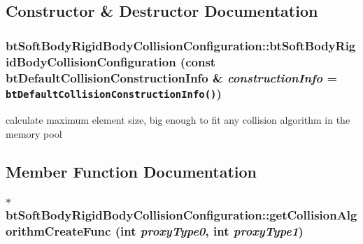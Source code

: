 \subsection{Constructor \& Destructor Documentation}
\hypertarget{classbt_soft_body_rigid_body_collision_configuration_ed032b3ffc351d036e28b503d3cdc801}{
\subsubsection[btSoftBodyRigidBodyCollisionConfiguration]{\setlength{\rightskip}{0pt plus 5cm}btSoftBodyRigidBodyCollisionConfiguration::btSoftBodyRigidBodyCollisionConfiguration (const btDefaultCollisionConstructionInfo \& {\em constructionInfo} = {\tt btDefaultCollisionConstructionInfo()})}}
\label{classbt_soft_body_rigid_body_collision_configuration_ed032b3ffc351d036e28b503d3cdc801}




calculate maximum element size, big enough to fit any collision algorithm in the memory pool 

\subsection{Member Function Documentation}
\hypertarget{classbt_soft_body_rigid_body_collision_configuration_81be88bc433469b4703fc0fb9d504a50}{
\subsubsection[getCollisionAlgorithmCreateFunc]{ $\ast$ btSoftBodyRigidBodyCollisionConfiguration::getCollisionAlgorithmCreateFunc (int {\em proxyType0}, \/  int {\em proxyType1})}}
\label{classbt_soft_body_rigid_body_collision_configuration_81be88bc433469b4703fc0fb9d504a50}


